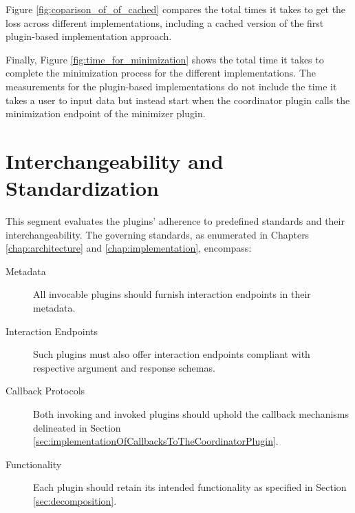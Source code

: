 \documentclass[
  a4paper,  %
  twoside,  %
  bibliography=totoc,
  headsepline,
  cleardoublepage=empty,
  parskip=half,
  draft=false
]{scrbook}
\begin{document}

Figure \ref{fig:coparison_of_of_cached} compares the total times it takes to get the loss across different implementations, including a cached version of the first plugin-based implementation approach.


Finally, Figure \ref{fig:time_for_minimization} shows the total time it takes to complete the minimization process for the different implementations.
The measurements for the plugin-based implementations do not include the time it takes a user to input data but instead start when the coordinator plugin calls the minimization endpoint of the minimizer plugin.


\section{Interchangeability and Standardization}
\label{sec:interchangeabilityOfPlugins}

This segment evaluates the plugins' adherence to predefined standards and their interchangeability.
The governing standards, as enumerated in Chapters \ref{chap:architecture} and \ref{chap:implementation}, encompass:

\begin{description}
  \item[Metadata] All invocable plugins should furnish interaction endpoints in their metadata.
  \item[Interaction Endpoints] Such plugins must also offer interaction endpoints compliant with respective argument and response schemas.
  \item[Callback Protocols] Both invoking and invoked plugins should uphold the callback mechanisms delineated in Section \ref{sec:implementationOfCallbacksToTheCoordinatorPlugin}.
  \item[Functionality] Each plugin should retain its intended functionality as specified in Section \ref{sec:decomposition}.
\end{description}
\end{document}
